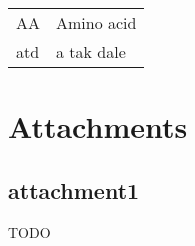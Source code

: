 \documentclass[12pt,a4paper]{report}
\begin{document}


\tableofcontents







\begin{tabular}{ll}
AA & Amino acid \\
atd & a tak dale \\
\end{tabular}




\listoffigures

\listoftables



\appendix
\chapter{Attachments}


\section{attachment1}

TODO
\end{document}
